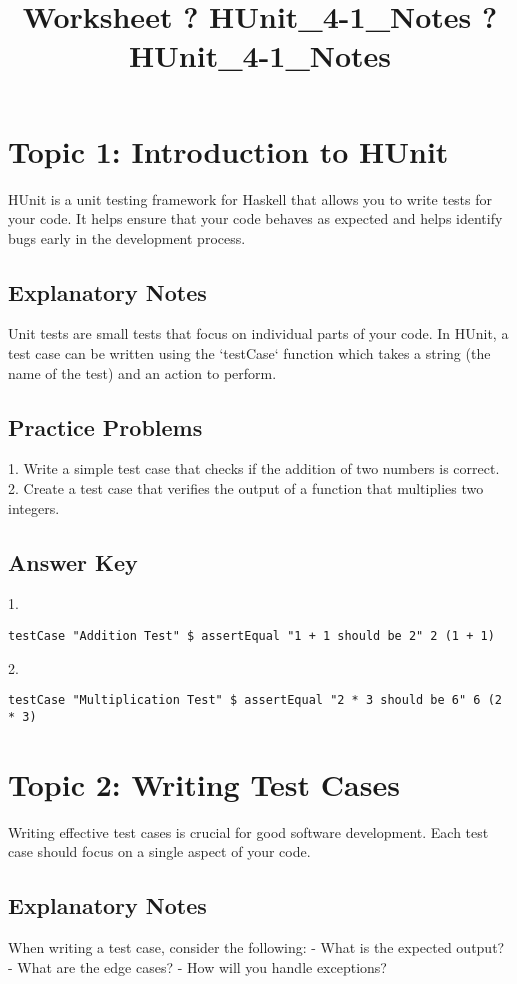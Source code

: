 \documentclass{article}
\title{Worksheet ? HUnit_4-1_Notes ? HUnit_4-1_Notes}
\author{}
\date{}
\begin{document}
\maketitle

\section*{Topic 1: Introduction to HUnit}
HUnit is a unit testing framework for Haskell that allows you to write tests for your code. It helps ensure that your code behaves as expected and helps identify bugs early in the development process. 

\subsection*{Explanatory Notes}
Unit tests are small tests that focus on individual parts of your code. In HUnit, a test case can be written using the `testCase` function which takes a string (the name of the test) and an action to perform.

\subsection*{Practice Problems}
1. Write a simple test case that checks if the addition of two numbers is correct.
2. Create a test case that verifies the output of a function that multiplies two integers.

\subsection*{Answer Key}
1. 
\begin{verbatim}
testCase "Addition Test" $ assertEqual "1 + 1 should be 2" 2 (1 + 1)
\end{verbatim}
2. 
\begin{verbatim}
testCase "Multiplication Test" $ assertEqual "2 * 3 should be 6" 6 (2 * 3)
\end{verbatim}

\section*{Topic 2: Writing Test Cases}
Writing effective test cases is crucial for good software development. Each test case should focus on a single aspect of your code.

\subsection*{Explanatory Notes}
When writing a test case, consider the following:
- What is the expected output?
- What are the edge cases?
- How will you handle exceptions?
\end{document}
